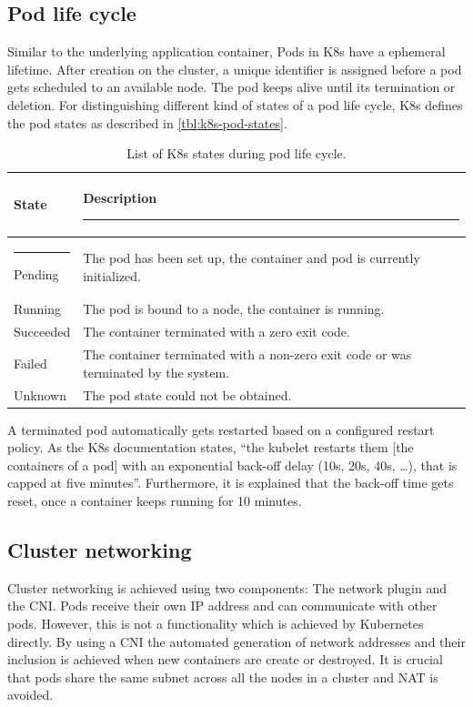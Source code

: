 \subsection{Pod life cycle}
\label{chap:design.life_cycle}
Similar to the underlying application container, Pods in \ac{K8s} have a ephemeral lifetime\cite{Kubernetes.20230217}. After creation on the cluster, a unique identifier is assigned before a pod gets scheduled to an available node\cite{Kubernetes.20230217}. The pod keeps alive until its termination or deletion\cite{Kubernetes.20230217}.
For distinguishing different kind of states of a pod life cycle, \ac{K8s} defines the pod states as described in \autoref{tbl:k8s-pod-states}.

\begin{table}[h!]
	\centering
	\begin{tabular}{|l | p{}|} 
		\hline
		\bfseries State & \bfseries Description  \rule{-5pt}{2.6ex} \\
		\hline \rule{-3pt}{3ex}
		Pending & The pod has been set up, the container and pod is currently initialized. \\
		\hline
		Running & The pod is bound to a node, the container is running. \\
		\hline
		Succeeded & The container terminated with a zero exit code. \\ 
		\hline
		Failed & The container terminated with a non-zero exit code or was terminated by the system. \\ 
		\hline
		Unknown & The pod state could not be obtained. \\ 
		[1ex] 
		\hline
	\end{tabular}
	\caption{List of \ac{K8s} states during pod life cycle\cite{Kubernetes.20230217}.}
	\label{tbl:k8s-pod-states}
\end{table}

A terminated pod automatically gets restarted based on a configured restart policy. As the \ac{K8s} documentation states, \enquote{the kubelet restarts them [the containers of a pod] with an exponential back-off delay (10s, 20s, 40s, …), that is capped at five minutes}\cite{Kubernetes.20230217}. Furthermore, it is explained that the back-off time gets reset, once a container keeps running for 10 minutes\cite{Kubernetes.20230217}.


\subsection{Cluster networking}
Cluster networking is achieved using two components: The network plugin and the \ac{CNI}. Pods receive their own \ac{IP} address and can communicate with other pods. However, this is not a functionality which is achieved by Kubernetes directly. By using a \ac{CNI} the automated generation of network addresses and their inclusion is achieved when new containers are create or destroyed. It is crucial that pods share the same subnet across all the nodes in a cluster and \ac{NAT} is avoided\cite{Luksa.2018}.

